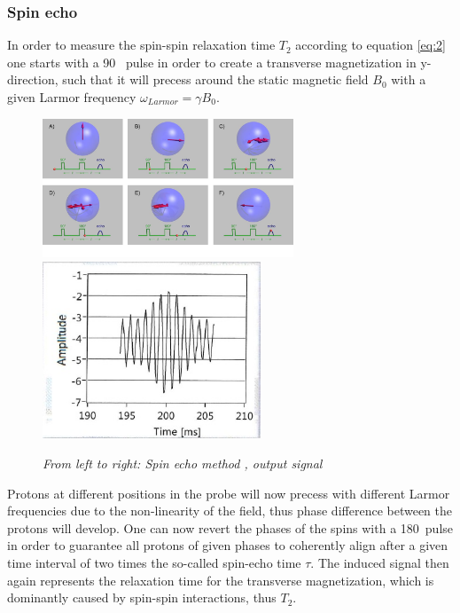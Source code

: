 \subsubsection{Spin echo} 
\label{sec:1} In order to measure the spin-spin relaxation time $T_2$ according to equation \ref{eq:2} one starts with a 90 \textdegree\, pulse in order to create a transverse magnetization in y-direction, such that it will precess around the static magnetic field $B_0$ with a given Larmor frequency $\omega_{Larmor} = \gamma B_0$.
\begin{figure}[h]
	\includegraphics[width=75mm
	]{Spinecho}
	\includegraphics[width=65mm]{Spinecho2}
	\centering
	\caption{\itshape From left to right: Spin echo method \cite{Spinecho}, output signal}
	\label{fig:1}
\end{figure}
\newpage
\noindent
 Protons at different positions in the probe will now precess with different Larmor frequencies due to the non-linearity of the field, thus phase difference between the protons will develop.
One can now revert the phases of the spins with a 180\textdegree\, pulse in order to guarantee all protons of given phases to coherently align after a given time interval of two times the so-called spin-echo time $\tau$. The induced signal then again represents the relaxation time for the transverse magnetization, which is dominantly caused by spin-spin interactions, thus $T_2$. \cite{manual} \cite{MRI}

 

